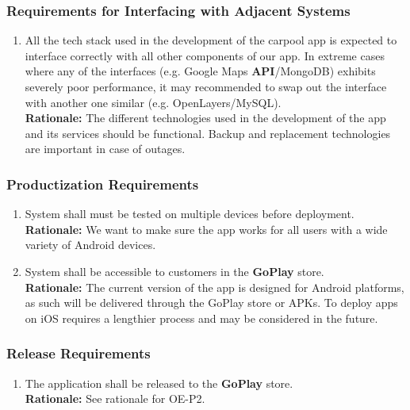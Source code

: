 \documentclass[]{article}
\begin{document}
\subsubsection{Requirements for Interfacing with Adjacent Systems}
\label{ssub:requirements_for_interfacing_with_adjacent_systems}
\begin{enumerate}[{OE-IA}1. ]
	\item All the tech stack used in the development of the carpool app is expected to interface correctly with all other components of our app. In extreme cases where any of the interfaces (e.g. Google Maps \textbf{API}/MongoDB) exhibits severely poor performance, it may recommended to swap out the interface with another one similar (e.g. OpenLayers/MySQL).\\
	{\bf Rationale:} The different technologies used in the development of the app and its services should be functional. Backup and replacement technologies are important in case of outages.
\end{enumerate}

\subsubsection{Productization Requirements}
\label{ssub:productization_requirements}
\begin{enumerate}[{OE-P}1. ]
	\item System shall must be tested on multiple devices before deployment.\\
	{\bf Rationale:} We want to make sure the app works for all users with a wide variety of Android devices.
	\item System shall be accessible to customers in the \textbf{GoPlay} store.\\
	{\bf Rationale:} The current version of the app is designed for Android platforms, as such will be delivered through the GoPlay store or APKs. To deploy apps on iOS requires a lengthier process and may be considered in the future. 
\end{enumerate}

\subsubsection{Release Requirements}
\label{ssub:release_requirements}
\begin{enumerate}[{OE-R}1. ]
	\item The application shall be released to the \textbf{GoPlay} store.\\
	{\bf Rationale:} See rationale for OE-P2.
\end{enumerate}
\end{document}
